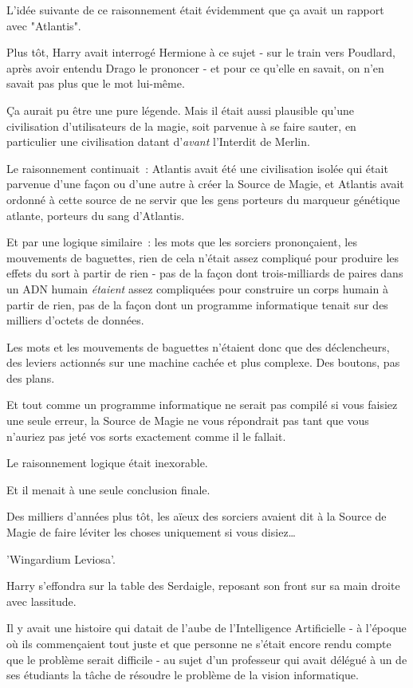 L'idée suivante de ce raisonnement était évidemment que ça avait un rapport avec "Atlantis".

Plus tôt, Harry avait interrogé Hermione à ce sujet - sur le train vers Poudlard, après avoir entendu Drago le prononcer - et pour ce qu'elle en savait, on n'en savait pas plus que le mot lui-même.

Ça aurait pu être une pure légende. Mais il était aussi plausible qu'une civilisation d'utilisateurs de la magie, soit parvenue à se faire sauter, en particulier une civilisation datant d'\emph{avant} l'Interdit de Merlin.

Le raisonnement continuait~: Atlantis avait été une civilisation isolée qui était parvenue d'une façon ou d'une autre à créer la Source de Magie, et Atlantis avait ordonné à cette source de ne servir que les gens porteurs du marqueur génétique atlante, porteurs du sang d'Atlantis.

Et par une logique similaire~: les mots que les sorciers prononçaient, les mouvements de baguettes, rien de cela n'était assez compliqué pour produire les effets du sort à partir de rien - pas de la façon dont trois-milliards de paires dans un ADN humain \emph{étaient} assez compliquées pour construire un corps humain à partir de rien, pas de la façon dont un programme informatique tenait sur des milliers d'octets de données.

Les mots et les mouvements de baguettes n'étaient donc que des déclencheurs, des leviers actionnés sur une machine cachée et plus complexe. Des boutons, pas des plans.

Et tout comme un programme informatique ne serait pas compilé si vous faisiez une seule erreur, la Source de Magie ne vous répondrait pas tant que vous n'auriez pas jeté vos sorts exactement comme il le fallait.

Le raisonnement logique était inexorable.

Et il menait à une seule conclusion finale.

Des milliers d'années plus tôt, les aïeux des sorciers avaient dit à la Source de Magie de faire léviter les choses uniquement si vous disiez…

'Wingardium Leviosa'.

Harry s'effondra sur la table des Serdaigle, reposant son front sur sa main droite avec lassitude.

Il y avait une histoire qui datait de l'aube de l'Intelligence Artificielle - à l'époque où ils commençaient tout juste et que personne ne s'était encore rendu compte que le problème serait difficile - au sujet d'un professeur qui avait délégué à un de ses étudiants la tâche de résoudre le problème de la vision informatique.


